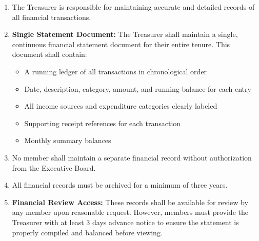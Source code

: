 
\begin{enumerate}[label=\alph*), leftmargin=2em, itemsep=0.3em]
    \item The Treasurer is responsible for maintaining accurate and detailed records of all financial transactions.
    
    \item \textbf{Single Statement Document:} The Treasurer shall maintain a single, continuous financial statement document for their entire tenure. This document shall contain:
    \begin{itemize}[leftmargin=1.5em, itemsep=0.2em]
        \item A running ledger of all transactions in chronological order
        \item Date, description, category, amount, and running balance for each entry
        \item All income sources and expenditure categories clearly labeled
        \item Supporting receipt references for each transaction
        \item Monthly summary balances
    \end{itemize}
    
    \item No member shall maintain a separate financial record without authorization from the Executive Board.
    
    \item All financial records must be archived for a minimum of three years.
    
    \item \textbf{Financial Review Access:} These records shall be available for review by any member upon reasonable request. However, members must provide the Treasurer with at least 3 days advance notice to ensure the statement is properly compiled and balanced before viewing.
\end{enumerate}


